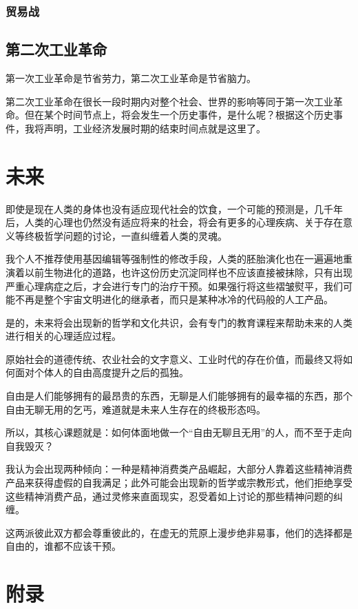 \documentclass[12pt,oneside]{book}
\begin{document}
\section{贸易战}


\chapter{第二次工业革命}
第一次工业革命是节省劳力，第二次工业革命是节省脑力。

第二次工业革命在很长一段时期内对整个社会、世界的影响等同于第一次工业革命。但在某个时间节点上，将会发生一个历史事件，是什么呢？根据这个历史事件，我将声明，工业经济发展时期的结束时间点就是这里了。



\part{未来}
即使是现在人类的身体也没有适应现代社会的饮食，一个可能的预测是，几千年后，人类的心理也仍然没有适应将来的社会，将会有更多的心理疾病、关于存在意义等终极哲学问题的讨论，一直纠缠着人类的灵魂。

我个人不推荐使用基因编辑等强制性的修改手段，人类的胚胎演化也在一遍遍地重演着以前生物进化的道路，也许这份历史沉淀同样也不应该直接被抹除，只有出现严重心理病症之后，才会进行专门的治疗干预。如果强行将这些褶皱熨平，我们可能不再是整个宇宙文明进化的继承者，而只是某种冰冷的代码般的人工产品。

是的，未来将会出现新的哲学和文化共识，会有专门的教育课程来帮助未来的人类进行相关的心理适应过程。

原始社会的道德传统、农业社会的文字意义、工业时代的存在价值，而最终又将如何面对个体人的自由高度提升之后的孤独。

自由是人们能够拥有的最昂贵的东西，无聊是人们能够拥有的最幸福的东西，那个自由无聊无用的乞丐，难道就是未来人生存在的终极形态吗。

所以，其核心课题就是：如何体面地做一个“自由无聊且无用”的人，而不至于走向自我毁灭？

我认为会出现两种倾向：一种是精神消费类产品崛起，大部分人靠着这些精神消费产品来获得虚假的自我满足；此外可能会出现新的哲学或宗教形式，他们拒绝享受这些精神消费产品，通过灵修来直面现实，忍受着如上讨论的那些精神问题的纠缠。

这两派彼此双方都会尊重彼此的，在虚无的荒原上漫步绝非易事，他们的选择都是自由的，谁都不应该干预。

\appendix
\part{附录}
\end{document}
